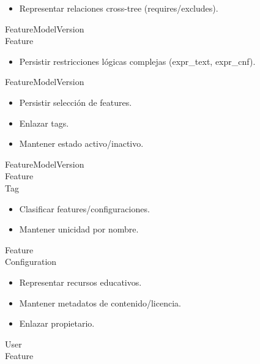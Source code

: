 \begin{addendum}
		\begin{crccard}
			\crcresp
			{
				\begin{itemize}
				\item Representar relaciones cross-tree (requires/excludes).
				\end{itemize}
			}
			\crccolab
			{
				FeatureModelVersion\\
				Feature
			}
		\end{crccard}

		\begin{crccard}
			\crcresp
			{
				\begin{itemize}
				\item Persistir restricciones lógicas complejas (expr\_text, expr\_cnf).
				\end{itemize}
			}
			\crccolab
			{
				FeatureModelVersion
			}
		\end{crccard}

		\begin{crccard}
			\crcresp
			{
				\begin{itemize}
				\item Persistir selección de features.
				\item Enlazar tags.
				\item Mantener estado activo/inactivo.
				\end{itemize}
			}
			\crccolab
			{
				FeatureModelVersion\\
				Feature\\
				Tag
			}
		\end{crccard}

		\begin{crccard}
			\crcresp
			{
				\begin{itemize}
				\item Clasificar features/configuraciones.
				\item Mantener unicidad por nombre.
				\end{itemize}
			}
			\crccolab
			{
				Feature\\
				Configuration
			}
		\end{crccard}

		\begin{crccard}
			\crcresp
			{
				\begin{itemize}
				\item Representar recursos educativos.
				\item Mantener metadatos de contenido/licencia.
				\item Enlazar propietario.
				\end{itemize}
			}
			\crccolab
			{
				User\\
				Feature
			}
		\end{crccard}


\end{addendum}
